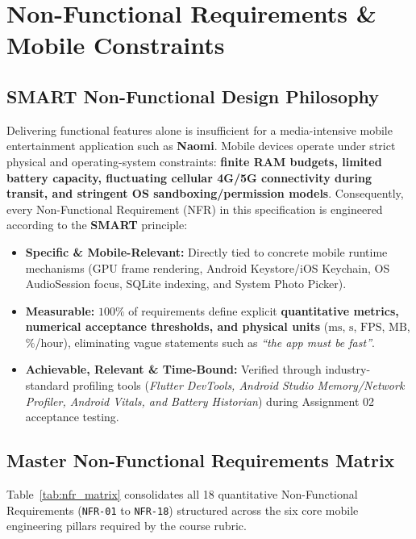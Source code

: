 \section{Non-Functional Requirements \& Mobile Constraints}
\label{sec:nfr}

\subsection{SMART Non-Functional Design Philosophy}
\label{subsec:nfr_philosophy}

Delivering functional features alone is insufficient for a media-intensive mobile entertainment application such as \textbf{Naomi}. Mobile devices operate under strict physical and operating-system constraints: \textbf{finite RAM budgets, limited battery capacity, fluctuating cellular 4G/5G connectivity during transit, and stringent OS sandboxing/permission models}. Consequently, every Non-Functional Requirement (NFR) in this specification is engineered according to the \textbf{SMART} principle:
\begin{itemize}
    \item \textbf{Specific \& Mobile-Relevant:} Directly tied to concrete mobile runtime mechanisms (GPU frame rendering, Android Keystore/iOS Keychain, OS AudioSession focus, SQLite indexing, and System Photo Picker).
    \item \textbf{Measurable:} $100\%$ of requirements define explicit \textbf{quantitative metrics, numerical acceptance thresholds, and physical units} ($\text{ms}$, $\text{s}$, $\text{FPS}$, $\text{MB}$, $\%$/hour), eliminating vague statements such as \textit{``the app must be fast''}.
    \item \textbf{Achievable, Relevant \& Time-Bound:} Verified through industry-standard profiling tools (\textit{Flutter DevTools, Android Studio Memory/Network Profiler, Android Vitals, and Battery Historian}) during Assignment 02 acceptance testing.
\end{itemize}

\subsection{Master Non-Functional Requirements Matrix}
\label{subsec:nfr_matrix}

Table~\ref{tab:nfr_matrix} consolidates all 18 quantitative Non-Functional Requirements (\texttt{NFR-01} to \texttt{NFR-18}) structured across the six core mobile engineering pillars required by the course rubric.

